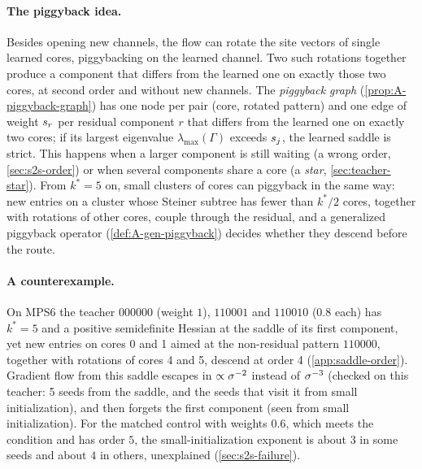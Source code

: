 \paragraph{The piggyback idea.}
Besides opening new channels, the flow can rotate the site vectors of single learned cores, piggybacking on the
learned channel. Two such rotations together produce a component that differs from the learned one on exactly
those two cores, at second order and without new channels. The \emph{piggyback graph}
(\cref{prop:A-piggyback-graph}) has one node per pair (core, rotated pattern) and one edge of weight $s_{r}$ per
residual component $r$ that differs from the learned one on exactly two cores; if its largest eigenvalue
$\lambda_{\max}(\Gamma)$ exceeds $s_{j}$, the learned saddle is strict. This happens when a larger component is
still waiting (a wrong order, \cref{sec:s2s-order}) or when several components share a core (a \emph{star},
\cref{sec:teacher-star}). From $k^*=5$ on, small clusters of cores can piggyback in the same way: new entries on a
cluster whose Steiner subtree has fewer than $k^*/2$ cores, together with rotations of other cores, couple through
the residual, and a generalized piggyback operator (\cref{def:A-gen-piggyback}) decides whether they descend
before the route.

\paragraph{A counterexample.}
On MPS6 the teacher $000000$ (weight $1$), $110001$ and $110010$ ($0.8$ each) has $k^*=5$ and a positive
semidefinite Hessian at the saddle of its first component, yet new entries on cores 0 and 1 aimed at the
non-residual pattern $110000$, together with rotations of cores 4 and 5, descend at order 4 \proven{}
(\cref{app:saddle-order}). Gradient flow from this saddle escapes in $\propto\sigma^{-2}$ instead of $\sigma^{-3}$
\derived{} (checked on this teacher: 5 seeds from the saddle, and the seeds that visit it from small
initialization), and then forgets the first component \empirical{} (seen from small initialization). For the
matched control with weights $0.6$, which meets the condition and has order $5$, the small-initialization exponent
is about $3$ in some seeds and about $4$ in others, unexplained (\cref{sec:s2s-failure}).

